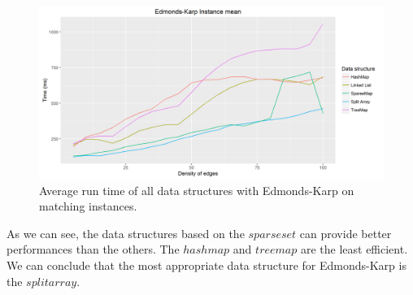 \begin{figure}[H]
\begin{center}
\includegraphics[scale=0.5]{images/ekmeanmatching2.png}
\caption{Average run time of all data structures with Edmonds-Karp on matching instances.}
\label{fig:ekmeanmatching}
\end{center}
\end{figure}
As we can see, the data structures based on the $sparse set$ can provide better performances than the others. The $hash map$ and $tree map$ are the least efficient. We can conclude that the most appropriate data structure for Edmonds-Karp is the $split array$.
